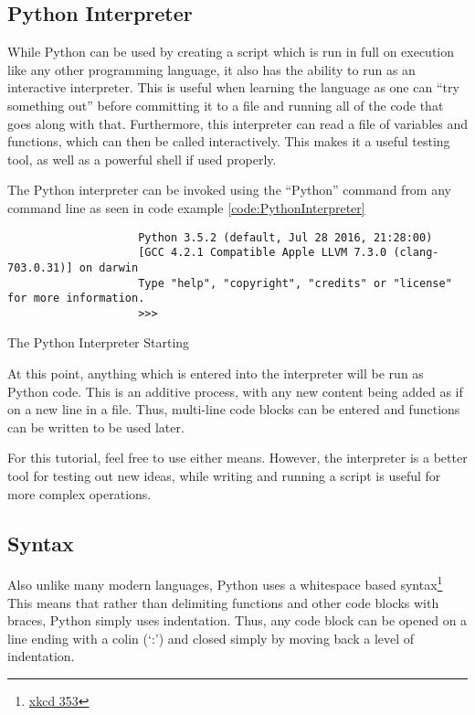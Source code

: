 		\subsection{Python Interpreter}
			While Python can be used by creating a script which is run in full on execution like any other programming language,
			it also has the ability to run as an interactive interpreter.
			This is useful when learning the language as one can ``try something out'' before committing it to a file and running all of the code that goes along with that.
			Furthermore, this interpreter can read a file of variables and functions, which can then be called interactively.
			This makes it a useful testing tool, as well as a powerful shell if used properly.

			The Python interpreter can be invoked using the ``Python'' command from any command line as seen in code example \ref{code:PythonInterpreter}
			\begin{code}
				\begin{verbatim}
					Python 3.5.2 (default, Jul 28 2016, 21:28:00)
					[GCC 4.2.1 Compatible Apple LLVM 7.3.0 (clang-703.0.31)] on darwin
					Type "help", "copyright", "credits" or "license" for more information.
					>>>
				\end{verbatim}
				\caption{The Python Interpreter Starting}
				\label{code:PythonInterpreter}
			\end{code}

			At this point, anything which is entered into the interpreter will be run as Python code.
			This is an additive process, with any new content being added as if on a new line in a file.
			Thus, multi-line code blocks can be entered and functions can be written to be used later.

			For this tutorial, feel free to use either means.
			However, the interpreter is a better tool for testing out new ideas, while writing and running a script is useful for more complex operations.
		\subsection{Syntax}
			Also unlike many modern languages, Python uses a whitespace based syntax\footnote{\href{https://www.xkcd.com/353/}{xkcd 353}}
			This means that rather than delimiting functions and other code blocks with braces, Python simply uses indentation.
			Thus, any code block can be opened on a line ending with a colin (`:') and closed simply by moving back a level of indentation.


